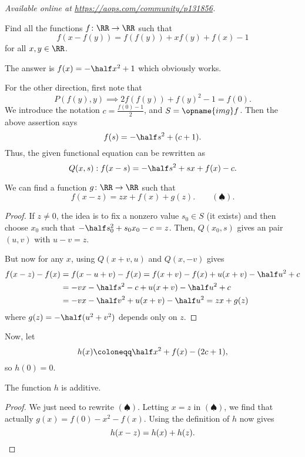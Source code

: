
\textsl{Available online at \url{https://aops.com/community/p131856}.}
\begin{mdframed}[style=mdpurplebox,frametitle={Problem statement}]
Find all the functions $f \colon \RR \to \RR$ such that
\[f(x-f(y))=f(f(y))+xf(y)+f(x)-1\]
for all $x,y \in \RR$.
\end{mdframed}
The answer is $f(x) = -\half x^2+1$
which obviously works.

For the other direction, first note that
\[ P(f(y),y) \implies 2f(f(y)) + f(y)^2 - 1 = f(0). \]
We introduce the notation $c = \frac{f(0)-1}{2}$,
and $S = \opname{img} f$.
Then the above assertion says
\[ f(s) = -\half s^2 + (c + 1). \]
Thus, the given functional equation can be rewritten as
\[ Q(x,s) : f(x-s)=-\half s^2 + sx + f(x) - c. \]

\begin{claim*}
  We can find a function $g \colon \RR \to \RR$ such that
  \[ f(x-z) = zx + f(x) + g(z). \qquad (\spadesuit). \]
\end{claim*}
\begin{proof}
  If $z \neq 0$,
  the idea is to fix a nonzero value $s_0 \in S$ (it exists)
  and then choose $x_0$ such that $- \half s_0^2 + s_0 x_0 - c = z$.
  Then, $Q(x_0, s)$ gives an pair $(u,v)$ with $u-v = z$.

  But now for any $x$, using $Q(x+v,u)$ and $Q(x,-v)$ gives
  \begin{align*}
    f(x-z)-f(x) &= f(x-u+v)-f(x)
    = f(x+v)-f(x) + u(x+v) - \half u^2 + c \\
    &= -vx-\half s^2-c + u(x+v) - \half u^2 + c \\
    &= -vx-\half v^2 + u(x+v) - \half u^2 = zx + g(z)
  \end{align*}
  where $g(z) = -\half(u^2+v^2)$ depends only on $z$.
\end{proof}

Now, let
\[ h(x) \coloneqq \half x^2 + f(x) - (2c+1), \]
so $h(0) = 0$.
\begin{claim*}
  The function $h$ is additive.
\end{claim*}
\begin{proof}
  We just need to rewrite $(\spadesuit)$.
  Letting $x=z$ in $(\spadesuit)$,
  we find that actually $g(x)=f(0)-x^2-f(x)$.
  Using the definition of $h$ now gives
  \[ h(x-z) = h(x) + h(z). \qedhere \]
\end{proof}

